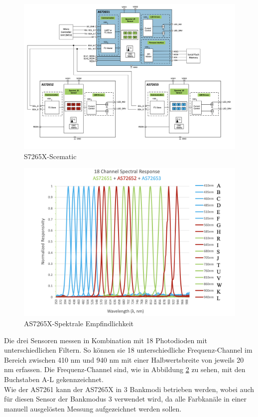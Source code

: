 \begin{figure}[H]
  \centering
 \includegraphics[width=0.9\linewidth]{img/AS7265X-Scematic.png}
 \caption{S7265X-Scematic\cite{Datenblatt_AS7265X}}
  \label{fig:S7265X-Scematic}
\end{figure}


\begin{figure}[H]
  \centering
 \includegraphics[width=0.9\linewidth]{img/AS7265X-Spectral_Responsivity.png}
 \caption{AS7265X-Spektrale Empfindlichkeit\cite{Datenblatt_AS7265X}}
  \label{fig:AS7261-Spectral_Responsivity}
\end{figure}

\noindent Die drei Sensoren messen in Kombination mit 18  Photodioden mit unterschiedlichen Filtern. So können sie 18 unterschiedliche Frequenz-Channel im Bereich zwischen 410 nm und 940 nm mit einer Halbwertsbreite von jeweils 20 nm erfassen.
Die Frequenz-Channel sind, wie in Abbildung \ref{fig:AS7261-Spectral_Responsivity} zu sehen, mit den Buchstaben A-L gekennzeichnet.\\
Wie der AS7261 kann der AS7265X in 3 Bankmodi betrieben werden, wobei auch für diesen Sensor der Bankmodus 3 verwendet wird, da alle Farbkanäle in einer manuell ausgelösten Messung aufgezeichnet werden sollen.
\newpage
